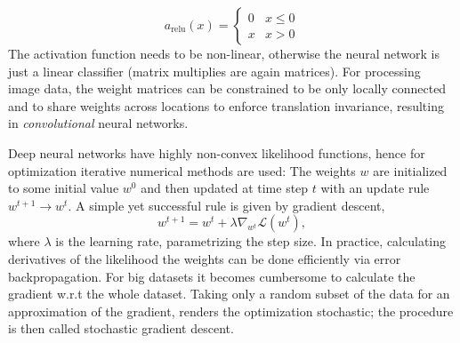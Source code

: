 		\begin{equation}
			a_{\textrm{relu}}(x)=
			\begin{cases}
			      0 & x\leq 0 \\
			      x & x > 0
			\end{cases}
		\end{equation}
		The activation function needs to be non-linear, otherwise the neural network is just a linear classifier (matrix multiplies are again matrices).
		For processing image data, the weight matrices can be constrained to be only locally connected and to share weights across locations to enforce translation invariance, resulting in \textit{convolutional} neural networks.

		Deep neural networks have highly non-convex likelihood functions, hence for optimization iterative numerical methods are used: The weights $w$ are initialized to some initial value $w^0$ 
		and then updated at time step $t$ with an update rule $w^{t+1}\rightarrow w^t$.
		A simple yet successful rule is given by gradient descent,
		\begin{equation}
			w^{t+1} = w^{t} + \lambda \nabla_{w^t}	 \mathcal{L} (w^t),
		\end{equation}
		where $\lambda$ is the learning rate, parametrizing the step size. In practice, calculating derivatives of the likelihood \wrt the weights can be done efficiently via error backpropagation.
		For big datasets it becomes cumbersome to calculate the gradient w.r.t the whole dataset. Taking only a random subset of the data for an approximation of the gradient, renders the optimization stochastic; the procedure is then called stochastic gradient descent.


\newpage

